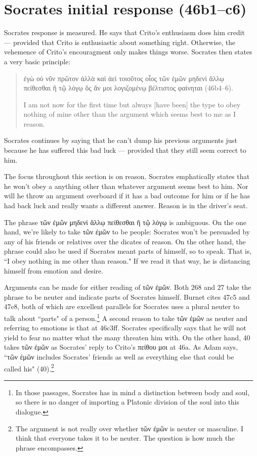 \documentclass[11pt]{article}
\begin{document}
\section{Socrates initial response (46b1--c6)}

Socrates response is measured. He says that Crito's enthusiasm does him credit --- provided that Crito is enthusiastic about something right. Otherwise, the vehemence of Crito's encouragment only makes things worse.  Socrates then states a very basic principle:

\begin{quote}
    ἐγὼ οὐ νῦν πρῶτον ἀλλὰ καὶ ἀεὶ τοιοῦτος οἷος τῶν ἐμῶν μηδενὶ ἄλλῳ πείθεσθαι ἢ τῷ λόγῳ ὃς ἄν μοι λογιζομένῳ βέλτιστος φαίνηται (46b4--6).

    I am not now for the first time but always [have been] the type to obey nothing of mine other than the argument which seems best to me as I reason.
\end{quote}

Socrates continues by saying that he can't dump his previous arguments just because he has suffered this bad luck --- provided that they still seem correct to him.

The focus throughout this section is on reason.  Socrates emphatically states that he won't obey a anything other than whatever argument seems best to him. Nor will he throw an argument overboard if it has a bad outcome for him or if he has had back luck and really wants a different answer.  Reason is in the driver's seat.

The phrase τῶν ἐμῶν μηδενὶ ἄλλῳ πείθεσθαι ἢ τῷ λόγῳ is ambiguous.  On the one hand, we're likely to take τῶν ἐμῶν to be people: Socrates won't be persuaded by any of his friends or relatives over the dicates of reason.  On the other hand, the phrase could also be used if Socrates meant parts of himself, so to speak. That is, ``I obey nothing in me other than reason."  If we read it that way, he is distancing himself from emotion and desire.

Arguments can be made for either reading of τῶν ἐμῶν. Both \citet{burnet1924} 268 and \citet{rose1983} 27 take the phrase to be neuter and indicate parts of Socrates himself.  Burnet cites 47c5 and 47e8, both of which are excellent parallels for Socrates uses a plural neuter to talk about ``parts" of a person.\footnote{In those passages, Socrates has in mind a distinction between body and soul, so there is no danger of importing a Platonic division of the soul into this dialogue.}  A second reason to take τῶν ἐμῶν as neuter and referring to emotions is that at 46c3ff. Socrates specifically says that he will not yield to fear no matter what the many threaten him with.  On the other hand, \citet{adam1988} 40 takes τῶν ἐμῶν as Socrates' reply to Crito's πείθου μοι at 46a.  As Adam says, ``τῶν ἐμῶν includes Socrates' friends as well as everything else that could be called his" (40).\footnote{The argument is not really over whether τῶν ἐμῶν is neuter or masculine.  I think that everyone takes it to be neuter.  The question is how much the phrase encompasses.}
\end{document}
